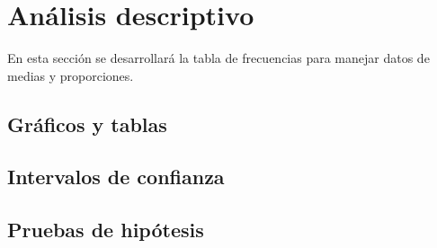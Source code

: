 \section{Análisis descriptivo}

En esta sección se desarrollará la tabla de frecuencias para manejar datos de medias y proporciones.

\subsection{Gráficos y tablas}

\subsection{Intervalos de confianza}

\subsection{Pruebas de hipótesis}

